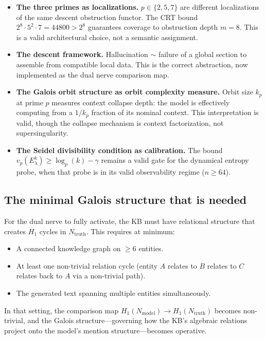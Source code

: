 \documentclass[11pt]{amsart}
\theoremstyle{definition}
\newcommand{\Nmod}{N_{\mathrm{model}}}
\newcommand{\Ntruth}{N_{\mathrm{truth}}}
\begin{document}
\begin{itemize}
\item \textbf{The three primes as localizations.}
  $p \in \{2,5,7\}$ are different localizations of the same descent obstruction
  functor. The CRT bound $2^8 \cdot 5^2 \cdot 7 = 44800 > 2^8$ guarantees
  coverage to obstruction depth $m=8$.
  This is a valid architectural choice, not a semantic assignment.
\item \textbf{The descent framework.}
  Hallucination $\sim$ failure of a global section to assemble from compatible
  local data. This is the correct abstraction, now implemented as the
  dual nerve comparison map.
\item \textbf{The Galois orbit structure as orbit complexity measure.}
  Orbit size $k_p$ at prime $p$ measures context collapse depth:
  the model is effectively computing from a $1/k_p$ fraction of its
  nominal context. This interpretation is valid, though the collapse
  mechanism is context factorization, not supersingularity.
\item \textbf{The Seidel divisibility condition as calibration.}
  The bound $v_p(E_\lambda^k) \geq \log_p(k) - \gamma$ remains a valid
  gate for the dynamical entropy probe, when that probe is in its valid
  observability regime ($n \geq 64$).
\end{itemize}

\subsection{The minimal Galois structure that is needed}

For the dual nerve to fully activate, the KB must have relational structure
that creates $H_1$ cycles in $\Ntruth$.
This requires at minimum:
\begin{itemize}
\item A connected knowledge graph on $\geq 6$ entities.
\item At least one non-trivial relation cycle (entity $A$ relates to $B$
  relates to $C$ relates back to $A$ via a non-trivial path).
\item The generated text spanning multiple entities simultaneously.
\end{itemize}
In that setting, the comparison map $H_1(\Nmod) \to H_1(\Ntruth)$ becomes
non-trivial, and the Galois structure---governing how the KB's algebraic
relations project onto the model's mention structure---becomes operative.

\end{document}
